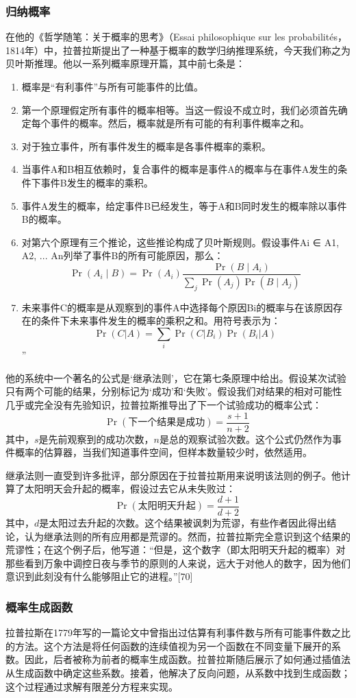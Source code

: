 \subsubsection{归纳概率}  
在他的《哲学随笔：关于概率的思考》（Essai philosophique sur les probabilités，1814年）中，拉普拉斯提出了一种基于概率的数学归纳推理系统，今天我们称之为贝叶斯推理。他以一系列概率原理开篇，其中前七条是：
\begin{enumerate}
\item 概率是“有利事件”与所有可能事件的比值。
\item 第一个原理假定所有事件的概率相等。当这一假设不成立时，我们必须首先确定每个事件的概率。然后，概率就是所有可能的有利事件概率之和。
\item 对于独立事件，所有事件发生的概率是各事件概率的乘积。
\item 当事件A和B相互依赖时，复合事件的概率是事件A的概率与在事件A发生的条件下事件B发生的概率的乘积。
\item 事件A发生的概率，给定事件B已经发生，等于A和B同时发生的概率除以事件B的概率。
\item 对第六个原理有三个推论，这些推论构成了贝叶斯规则。假设事件Ai ∈ {A1, A2, ... An}列举了事件B的所有可能原因，那么：  
   \[
   \Pr(A_{i}\mid B) = \Pr(A_{i}) \frac{\Pr(B \mid A_{i})}{\sum _{j} \Pr(A_{j}) \Pr(B \mid A_{j})}~
   \]
\item 未来事件C的概率是从观察到的事件A中选择每个原因Bi的概率与在该原因存在的条件下未来事件发生的概率的乘积之和。用符号表示为：  
   \[
   \Pr(C|A) = \sum _{i} \Pr(C|B_{i}) \Pr(B_{i}|A)~
   \]”
\end{enumerate}
他的系统中一个著名的公式是‘继承法则’，它在第七条原理中给出。假设某次试验只有两个可能的结果，分别标记为‘成功’和‘失败’。假设我们对结果的相对可能性几乎或完全没有先验知识，拉普拉斯推导出了下一个试验成功的概率公式：
\[
\Pr(\text{下一个结果是成功}) = \frac{s+1}{n+2}~
\]
其中，\(s\)是先前观察到的成功次数，\(n\)是总的观察试验次数。这个公式仍然作为事件概率的估算器，当我们知道事件空间，但样本数量较少时，依然适用。

继承法则一直受到许多批评，部分原因在于拉普拉斯用来说明该法则的例子。他计算了太阳明天会升起的概率，假设过去它从未失败过：
\[
\Pr(\text{太阳明天升起}) = \frac{d+1}{d+2}~
\]
其中，\(d\)是太阳过去升起的次数。这个结果被讽刺为荒谬，有些作者因此得出结论，认为继承法则的所有应用都是荒谬的。然而，拉普拉斯完全意识到这个结果的荒谬性；在这个例子后，他写道：“但是，这个数字（即太阳明天升起的概率）对那些看到万象中调控日夜与季节的原则的人来说，远大于对他人的数字，因为他们意识到此刻没有什么能够阻止它的进程。”[70]
\subsubsection{概率生成函数}  
拉普拉斯在1779年写的一篇论文中曾指出过估算有利事件数与所有可能事件数之比的方法。这个方法是将任何函数的连续值视为另一个函数在不同变量下展开的系数。因此，后者被称为前者的概率生成函数。拉普拉斯随后展示了如何通过插值法从生成函数中确定这些系数。接着，他解决了反向问题，从系数中找到生成函数；这个过程通过求解有限差分方程来实现。
